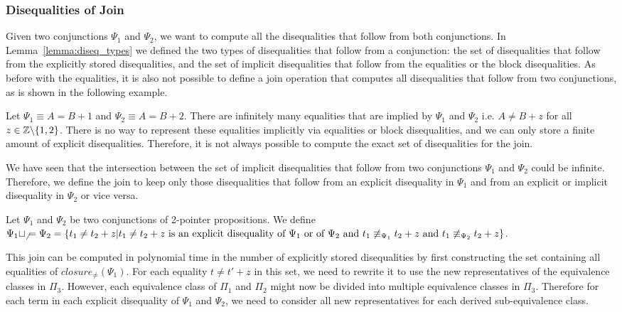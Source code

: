 \subsubsection{Disequalities of Join}
Given two conjunctions $\Psi_1$ and $\Psi_2$, we want to compute all the disequalities that follow from both conjunctions.
In Lemma~\ref{lemma:diseq_types} we defined the two types of disequalities that follow from a conjunction: the set of disequalities that follow from the explicitly stored disequalities, and the set of implicit disequalities that follow from the equalities or the block disequalities.
As before with the equalities, it is also not possible to define a join operation that computes all disequalities that follow from two conjunctions, as is shown in the following example.

\begin{example}
    Let $\Psi_1 \equiv A = B + 1$ and $\Psi_2 \equiv A = B + 2$. There are infinitely many equalities that are implied by $\Psi_1$ and $\Psi_2$ i.e. $A \neq B + z$ for all $z \in \mathbb{Z} \backslash \{1,2\}$.
    There is no way to represent these equalities implicitly via equalities or block disequalities, and we can only store a finite amount of explicit disequalities. Therefore, it is not always possible to compute the exact set of disequalities for the join.
\end{example}

We have seen that the intersection between the set of implicit disequalities that follow from two conjunctions $\Psi_1$ and $\Psi_2$ could be infinite.
Therefore, we define the join to keep only those disequalities that follow from an explicit disequality in $\Psi_1$ and from an explicit or implicit disequality in $\Psi_2$ or vice versa.

\begin{definition}
    Let $\Psi_1$ and $\Psi_2$ be two conjunctions of 2-pointer propositions. We define $\Psi_1 \sqcup_\neq \Psi_2 = \{t_1 \neq t_2 + z | t_1 \neq t_2 + z \text{ is an explicit disequality of } \Psi_1 \text{ or of } \Psi_2 \text{ and } t_1 \not\equiv_{\Psi_1} t_2 + z \text{ and } t_1 \not\equiv_{\Psi_2} t_2 + z\}$.
\end{definition}

This join can be computed in polynomial time in the number of explicitly stored disequalities by first constructing the set containing all equalities of $closure_\neq(\Psi_1)$.
For each equality $t \neq t' + z$ in this set, we need to rewrite it to use the new representatives of the equivalence classes in $\Pi_3$.
However, each equivalence class of $\Pi_1$ and $\Pi_2$ might now be divided into multiple equivalence classes in $\Pi_3$.
Therefore for each term in each explicit disequality of $\Psi_1$ and $\Psi_2$, we need to consider all new representatives for each derived sub-equivalence class.

